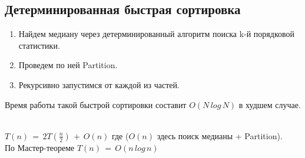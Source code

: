 \subsection*{Детерминированная быстрая сортировка}

\Alg
\begin{enumerate}
    \item Найдем медиану через детерминированный алгоритм поиска k-й порядковой статистики.
    \item Проведем по ней Partition.
    \item Рекурсивно запустимся от каждой из частей.
\end{enumerate}

\Statement Время работы такой быстрой сортировки составит $O(N\,log\,N)$ в худшем случае.

\Proof \\
$T(n)\,=\,2T(\frac{n}{2})\,+\,O(n)$ где ($O(n)$ здесь поиск медианы + Partition). \\По Мастер-теореме $T(n)\,=\,O(n\,log\,n)$ \Endproof

\pagebreak